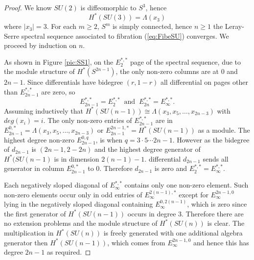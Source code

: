 \documentclass{article}
\theoremstyle{plain}
\theoremstyle{definition}
\numberwithin{thm}{section}
\begin{document}
		\begin{proof}
			We know $SU(2)$ is diffeomorphic to $S^{3}$, hence
			\begin{equation*}
			H^{*}(SU(3)) = \Lambda(x_3)
			\end{equation*}
			where $|x_3|=3$.
			For each $m \geq 2$, $S^{m}$ is simply connected,
			hence $n\geq 1$ the Leray-Serre spectral sequence associated to fibration (\ref{eq:FibeSU}) converges.
			We proceed by induction on $n$.
			
			As shown in Figure \ref{pic:SS1}, on the $E_{2}^{*,*}$ page of the spectral sequence, due to the module structure of $H^{*}(S^{2n-1})$,
			the only non-zero columns are at $0$ and $2n-1$.
			Since differentials have bidegree $(r,1-r)$ all differential on pages other than $E_{2n-1}^{*,*}$ are zero, so
			\begin{equation*}
				E_{2n-1}^{*,*}=E_2^{*,*} \;\; \text{and} \;\; E_{2n}^{*,*}=E_{\infty}^{*,*}.
			\end{equation*}
			Assuming inductively that $H^{*}(SU(n-1)) \cong \Lambda (x_3,x_5, \dots ,x_{2n-3})$ with $deg(x_{i})=i$.
			The only non-zero entries of $E_{2n-1}^{*,*}$ are in
			$E_{2n-1}^{0,*} = {\Lambda}(x_3,x_5, \dots ,x_{2n-3})$ or $E_{2n-1}^{2n-1,*} = H^{*}(SU(n-1))$ as a module.
			The highest degree non-zero $E_{2n-1}^{0,q}$, is when $q=3 \cdot 5 \cdots 2n-1$.
			However as the bidegree of $d_{2n-1}$ is $(2n-1,2-2n)$ and the highest degree generator of $H^{*}(SU(n-1)$ is in dimension $2(n-1)-1$.
			differential $d_{2n-1}$ sends all generator  in column $E_{2n-1}^{0,*}$ to $0$.
			Therefore $d_{2n-1}$ is zero and $E_2^{*,*}=E_{\infty}^{*,*}$.
			
			Each negatively sloped diagonal of $E_{\infty}^{*,*}$ contains only one non-zero element. 
			Such non-zero elements occur only in odd entries of $E_{\infty}^{2(n-1),*}$ except for $E_{\infty}^{2n-1,0}$ lying in the negatively sloped diagonal containing 
			$E_{\infty}^{0,2(n-1)}$, which is zero since the first generator of $H^{*}(SU(n-1))$ occurs in degree $3$.
			Therefore there are no extension problems and the module structure of $H^{*}(SU(n))$ is clear.
			The multiplication in $H^{*}(SU(n))$ is freely generated
			with one additional algebra generator then $H^{*}(SU(n-1))$, which comes from $E_{\infty}^{2n-1,0}$ and hence this has degree $2n-1$ as required.
			

\end{proof}
\end{document}
